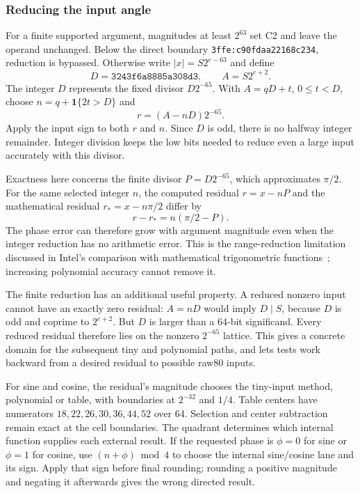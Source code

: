 \documentclass[11pt]{article}
\newcommand{\hex}[1]{\texttt{#1}}
\begin{document}
\subsubsection{Reducing the input angle}

For a finite supported argument, magnitudes at least $2^{63}$ set C2 and
leave the operand unchanged. Below the direct boundary
\hex{3ffe:c90fdaa22168c234}, reduction is bypassed. Otherwise write
$|x|=S2^{e-63}$ and define
\begin{equation}
 D=\hex{3243f6a8885a308d3},\qquad A=S2^{e+2}.
\end{equation}
The integer $D$ represents the fixed divisor $D2^{-65}$. With
$A=qD+t$, $0\leq t<D$, choose $n=q+\mathbf1\{2t>D\}$ and
\begin{equation}
 r=(A-nD)2^{-65}.
\end{equation}
Apply the input sign to both $r$ and $n$. Since $D$ is odd, there is no
halfway integer remainder. Integer division keeps the low bits needed to reduce even a large input
accurately with this divisor.

Exactness here concerns the finite divisor $P=D2^{-65}$, which approximates
$\pi/2$. For the same selected integer $n$, the computed residual $r=x-nP$
and the mathematical residual $r_*=x-n\pi/2$ differ by
\begin{equation}
r-r_*=n(\pi/2-P).
\end{equation}
The phase error can therefore grow with argument magnitude even when the
integer reduction has no arithmetic error. This is the range-reduction
limitation discussed in Intel's comparison with mathematical trigonometric
functions~\cite{intelDifference}; increasing polynomial accuracy cannot
remove it.

The finite reduction has an additional useful property. A reduced nonzero
input cannot have an exactly zero residual: $A=nD$ would imply $D\mid S$, because $D$
is odd and coprime to $2^{e+2}$. But $D$ is larger than a 64-bit significand.
Every reduced residual therefore lies on the nonzero $2^{-65}$ lattice.
This gives a concrete domain for the subsequent tiny and polynomial paths,
and lets tests work backward from a desired residual to possible raw80 inputs.

For sine and cosine, the residual's magnitude chooses the tiny-input method,
polynomial or table, with boundaries at $2^{-32}$ and $1/4$. Table centers have numerators
$18,22,26,30,36,44,52$ over 64. Selection and center subtraction remain
exact at the cell boundaries. The quadrant determines which internal function supplies each external
result. If the requested phase is $\phi=0$ for sine or $\phi=1$ for cosine,
use $(n+\phi)\bmod4$ to choose the internal sine/cosine lane and its sign.
Apply that sign before final rounding; rounding a positive magnitude and
negating it afterwards gives the wrong directed result.
\end{document}
